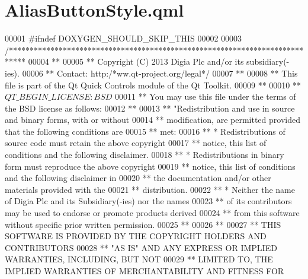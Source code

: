 \hypertarget{AliasButtonStyle_8qml}{\section{Alias\-Button\-Style.\-qml}
\label{AliasButtonStyle_8qml}
}

\begin{DoxyCode}
00001 \textcolor{preprocessor}{#ifndef DOXYGEN\_SHOULD\_SKIP\_THIS}
00002 \textcolor{preprocessor}{}
00003 \textcolor{comment}{/****************************************************************************}
00004 \textcolor{comment}{**}
00005 \textcolor{comment}{** Copyright (C) 2013 Digia Plc and/or its subsidiary(-ies).}
00006 \textcolor{comment}{** Contact: http:/*ww.qt-project.org/legal*/}
00007 **
00008 ** This file is part of the Qt Quick Controls module of the Qt Toolkit.
00009 **
00010 ** $QT\_BEGIN\_LICENSE:BSD$
00011 ** You may use \textcolor{keyword}{this} file under the terms of the BSD license as follows:
00012 **
00013 ** \textcolor{stringliteral}{"Redistribution and use in source and binary forms, with or without}
00014 \textcolor{stringliteral}{** modification, are permitted provided that the following conditions are}
00015 \textcolor{stringliteral}{** met:}
00016 \textcolor{stringliteral}{**   * Redistributions of source code must retain the above copyright}
00017 \textcolor{stringliteral}{**     notice, this list of conditions and the following disclaimer.}
00018 \textcolor{stringliteral}{**   * Redistributions in binary form must reproduce the above copyright}
00019 \textcolor{stringliteral}{**     notice, this list of conditions and the following disclaimer in}
00020 \textcolor{stringliteral}{**     the documentation and/or other materials provided with the}
00021 \textcolor{stringliteral}{**     distribution.}
00022 \textcolor{stringliteral}{**   * Neither the name of Digia Plc and its Subsidiary(-ies) nor the names}
00023 \textcolor{stringliteral}{**     of its contributors may be used to endorse or promote products derived}
00024 \textcolor{stringliteral}{**     from this software without specific prior written permission.}
00025 \textcolor{stringliteral}{**}
00026 \textcolor{stringliteral}{**}
00027 \textcolor{stringliteral}{** THIS SOFTWARE IS PROVIDED BY THE COPYRIGHT HOLDERS AND CONTRIBUTORS}
00028 \textcolor{stringliteral}{** "}AS IS\textcolor{stringliteral}{" AND ANY EXPRESS OR IMPLIED WARRANTIES, INCLUDING, BUT NOT}
00029 \textcolor{stringliteral}{** LIMITED TO, THE IMPLIED WARRANTIES OF MERCHANTABILITY AND FITNESS FOR}

\end{DoxyCode}
